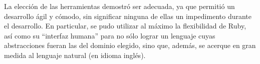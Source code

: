 \documentclass[10pt]{article}
\numberwithin{equation}{section}
\numberwithin{figure}{section}
\numberwithin{table}{section}
\begin{document}
La elección de las herramientas demostró ser adecuada, ya que permitió un desarrollo ágil y cómodo, sin significar ninguna de ellas un impedimento durante el desarrollo. En particular, se pudo utilizar al máximo la flexibilidad de Ruby, así como su ``interfaz humana''\cite{Fow:02} para no sólo lograr un lenguaje cuyas abstracciones fueran las del dominio elegido, sino que, además, se acerque en gran medida al lenguaje natural (en idioma inglés).

\newpage


\end{document}
